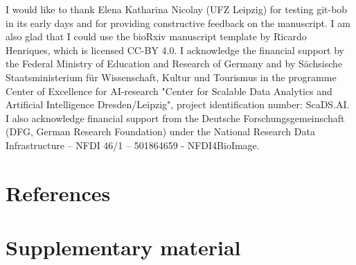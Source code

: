 \documentclass[times, twoside]{zHenriquesLab-StyleBioRxiv}
\begin{document}
\begin{acknowledgements}

I would like to thank Elena Katharina Nicolay (UFZ Leipzig) for testing git-bob in its early days and for providing constructive feedback on the manuscript. I am also glad that I could use the bioRxiv manuscript template by Ricardo Henriques, which is licensed CC-BY 4.0. I acknowledge the financial support by the Federal Ministry of Education and Research of Germany and by Sächsische Staatsministerium für Wissenschaft, Kultur und Tourismus in the programme Center of Excellence for AI-research "Center for Scalable Data Analytics and Artificial Intelligence Dresden/Leipzig", project identification number: ScaDS.AI. I also acknowledge financial support from the Deutsche Forschungsgemeinschaft (DFG, German Research Foundation) under the National Research Data Infrastructure – NFDI 46/1 – 501864659 - NFDI4BioImage.

\end{acknowledgements}

\section*{References}


\onecolumn
\newpage





\section*{Supplementary material}
\setcounter{figure}{0} 
\renewcommand{\thefigure}{S\arabic{figure}}
\end{document}
